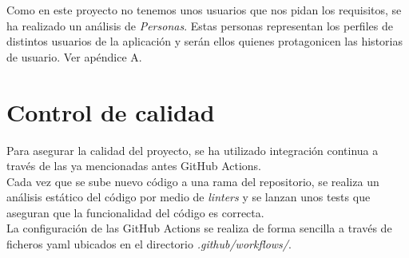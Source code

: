 
Como en este proyecto no tenemos unos usuarios que nos pidan los requisitos, se ha realizado un análisis de \textit{Personas}\cite{personas}. Estas personas representan los perfiles de distintos usuarios de la aplicación y serán ellos quienes protagonicen las historias de usuario. Ver apéndice A.

\section{Control de calidad}
Para asegurar la calidad del proyecto, se ha utilizado integración continua a través de las ya mencionadas antes GitHub Actions.\\

Cada vez que se sube nuevo código a una rama del repositorio, se realiza un análisis estático del código por medio de \textit{linters} y se lanzan unos tests que aseguran que la funcionalidad del código es correcta.\\

La configuración de las GitHub Actions se realiza de forma sencilla a través de ficheros yaml ubicados en el directorio \textit{.github/workflows/}.\\



